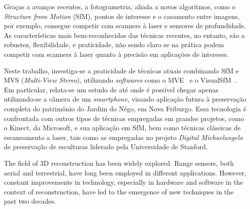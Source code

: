 \documentclass[a4paper,12pt,oneside,onecolumn,final,fleqn]{repUERJ}
\theoremstyle{plain}
\theoremstyle{definition}
\begin{document}
Graças a avanços recentes, a fotogrametria, aliada a novos algoritmos,
como o \emph{Structure from Motion} (SfM), pontos de interesse e o casamento entre
imagens, por exemplo, consegue competir com scanners à laser e sensores de
profundidade. As características mais bem-reconhecidas das técnicas recentes, no
entanto, são a robustez, flexibilidade, e praticidade, não sendo claro se na prática podem 
competir com scanners à laser quanto à precisão em aplicações de interesse.

Neste trabalho, investiga-se a praticidade de técnicas atuais combinando SfM e MVS
(\emph{Multi-View Stereo}), utilizando \emph{softwares} como o MVE~\cite{mve} e
o VisualSfM~\cite{wu2011visualsfm}. Em particular, relata-se um estudo de até
onde é possível chegar apenas utilizando-se a câmera de um \emph{smartphone}, visando
aplicação futura à preservação completa do patrimônio do Jardim do Nêgo, em Nova Friburgo.
Essa tecnologia é confrontada com outros tipos de técnicas empregadas em
grandes projetos, como o Kinect, da Microsoft, e sua aplicação em SfM, bem como técnicas clássicas de 
escaneamento a laser, tais como as empregadas no projeto \emph{Digital Michaelangelo} de preservação de
esculturas liderado pela Universidade de Stanford.





\imprimirchaves




The field of 3D reconstruction has been widely explored. Range sensors, both aerial
and terrestrial, have long been employed in different applications. However, constant
improvements in technology, especially in hardware and software in the context
of reconstruction, have led to the emergence of new techniques in the past two decades.
\end{document}
